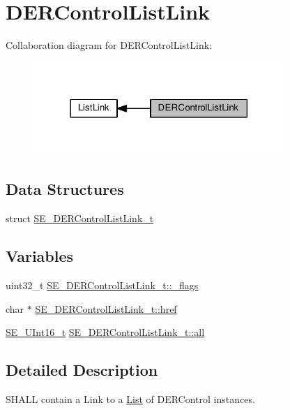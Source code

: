 \hypertarget{group__DERControlListLink}{}\section{D\+E\+R\+Control\+List\+Link}
\label{group__DERControlListLink}
Collaboration diagram for D\+E\+R\+Control\+List\+Link\+:\nopagebreak
\begin{figure}[H]
\begin{center}
\leavevmode
\includegraphics[width=270pt]{group__DERControlListLink}
\end{center}
\end{figure}
\subsection*{Data Structures}
\begin{DoxyCompactItemize}
\item 
struct \hyperlink{structSE__DERControlListLink__t}{S\+E\+\_\+\+D\+E\+R\+Control\+List\+Link\+\_\+t}
\end{DoxyCompactItemize}
\subsection*{Variables}
\begin{DoxyCompactItemize}
\item 
uint32\+\_\+t \hyperlink{group__DERControlListLink_ga1252d821e67ab41c8caafaaf8f3e83be}{S\+E\+\_\+\+D\+E\+R\+Control\+List\+Link\+\_\+t\+::\+\_\+flags}
\item 
char $\ast$ \hyperlink{group__DERControlListLink_gafecc636897f0be0e049531c10b59621d}{S\+E\+\_\+\+D\+E\+R\+Control\+List\+Link\+\_\+t\+::href}
\item 
\hyperlink{group__UInt16_gac68d541f189538bfd30cfaa712d20d29}{S\+E\+\_\+\+U\+Int16\+\_\+t} \hyperlink{group__DERControlListLink_ga3fbaa85b2e1da1b034164f21a22a1503}{S\+E\+\_\+\+D\+E\+R\+Control\+List\+Link\+\_\+t\+::all}
\end{DoxyCompactItemize}


\subsection{Detailed Description}
S\+H\+A\+LL contain a Link to a \hyperlink{structList}{List} of D\+E\+R\+Control instances. 

